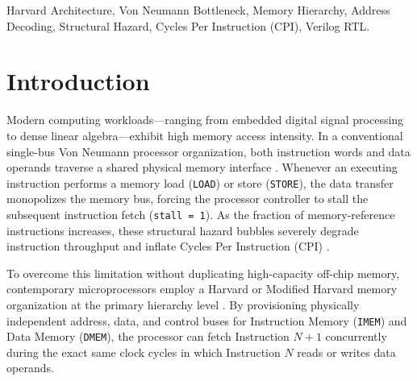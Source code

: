 \documentclass[conference]{IEEEtran}
\begin{document}
\begin{IEEEkeywords}
Harvard Architecture, Von Neumann Bottleneck, Memory Hierarchy, Address Decoding, Structural Hazard, Cycles Per Instruction (CPI), Verilog RTL.
\end{IEEEkeywords}

\section{Introduction}
Modern computing workloads---ranging from embedded digital signal processing to dense linear algebra---exhibit high memory access intensity. In a conventional single-bus Von Neumann processor organization, both instruction words and data operands traverse a shared physical memory interface \cite{hennessy2017}. Whenever an executing instruction performs a memory load (\texttt{LOAD}) or store (\texttt{STORE}), the data transfer monopolizes the memory bus, forcing the processor controller to stall the subsequent instruction fetch (\texttt{stall = 1}). As the fraction of memory-reference instructions increases, these structural hazard bubbles severely degrade instruction throughput and inflate Cycles Per Instruction (CPI) \cite{patterson2020}.

To overcome this limitation without duplicating high-capacity off-chip memory, contemporary microprocessors employ a Harvard or Modified Harvard memory organization at the primary hierarchy level \cite{hennessy2017, patterson2020}. By provisioning physically independent address, data, and control buses for Instruction Memory (\texttt{IMEM}) and Data Memory (\texttt{DMEM}), the processor can fetch Instruction $N+1$ concurrently during the exact same clock cycles in which Instruction $N$ reads or writes data operands.
\end{document}
